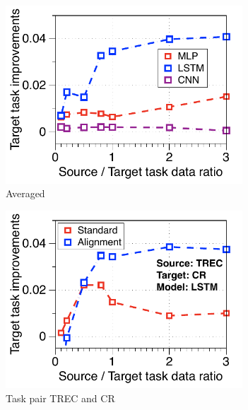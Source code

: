 \begin{figure}[!ht]
	\centering
	\begin{subfigure}[b]{0.33\textwidth}
		\centering
		\includegraphics[width=0.975\textwidth]{figures/ratio_alignment_norm_diff_all.pdf}
		\caption{Averaged}
	\end{subfigure}\hfill
	\begin{subfigure}[b]{0.33\textwidth}
		\centering
		\includegraphics[width=0.975\textwidth]{figures/ratio_alignment_norm_trec_cr_lstm.pdf}
		\caption{Task pair TREC and CR}
	\end{subfigure}\hfill
		\begin{subfigure}[b]{0.33\textwidth}
		\centering

\end{subfigure}
\end{figure}
